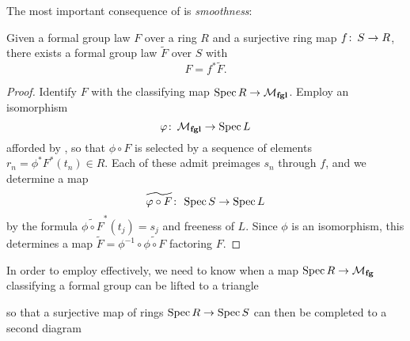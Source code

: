 The most important consequence of  is \emph{smoothness}:
\begin{corollary}\label{MfglIsSmooth}
Given a formal group law $F$ over a ring $R$ and a surjective ring map $f\colon\thinspace S \to R$, there exists a formal group law $\widetilde F$ over $S$ with \[F = f^* \widetilde F.\]
\end{corollary}
\begin{proof}
Identify $F$ with the classifying map $\operatorname{Spec} R \to \mathcal{M}_{\mathbf{fgl}}$.  Employ an isomorphism \[\varphi\colon\thinspace \mathcal{M}_{\mathbf{fgl}} \to \operatorname{Spec} L\] afforded by , so that $\phi \circ F$ is selected by a sequence of elements $r_n = \phi^* F^*(t_n) \in R$.  Each of these admit preimages $s_n$ through $f$, and we determine a map \[\widetilde{\varphi \circ F}\colon\thinspace \operatorname{Spec} S \to \operatorname{Spec} L\] by the formula $\widetilde{\phi \circ F}^* (t_j) = s_j$ and freeness of $L$.  Since $\phi$ is an isomorphism, this determines a map $\widetilde F = \phi^{-1} \circ \widetilde{\phi \circ F}$ factoring $F$.
\end{proof}

In order to employ  effectively, we need to know when a map $\operatorname{Spec} R \to \mathcal{M}_{\mathbf{fg}}$ classifying a formal group can be lifted to a triangle
\begin{center}
\end{center}
so that a surjective map of rings $\operatorname{Spec} R \to \operatorname{Spec} S$ can then be completed to a second diagram
\begin{center}
\end{center}

